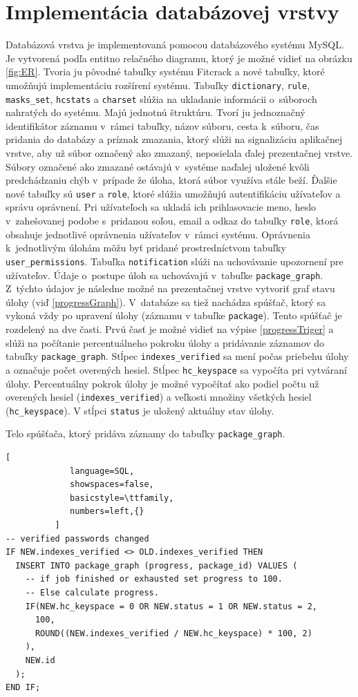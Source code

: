 \documentclass[slovak]{fitthesis}
\begin{document}
\section{Implementácia databázovej vrstvy}
Databázová vrstva je implementovaná pomocou databázového systému MySQL. Je vytvorená podľa entitno relačného diagramu, ktorý je možné vidieť na obrázku \ref{fig:ER}. Tvoria ju pôvodné tabuľky systému Fitcrack a nové tabuľky, ktoré umožňujú implementáciu rozšírení systému. Tabuľky \texttt{dictionary}, \texttt{rule}, \texttt{masks\_set}, \texttt{hcstats} a \texttt{charset} slúžia na ukladanie informácii o~súboroch nahratých do systému. Majú jednotnú štruktúru. Tvorí ju jednoznačný identifikátor záznamu v~rámci tabuľky, názov súboru, cesta k~súboru, čas pridania do databázy a príznak zmazania, ktorý slúži na signalizáciu aplikačnej vrstve, aby už súbor označený ako zmazaný, neposielala ďalej prezentačnej vrstve. Súbory označené ako zmazané ostávajú v~systéme naďalej uložené kvôli predchádzaniu chýb v~prípade že úloha, ktorá súbor využíva stále beží. Ďalšie nové tabuľky sú \texttt{user} a \texttt{role}, ktoré slúžia umožňujú autentifikáciu užívateľov a správu oprávnení. Pri užívateľoch sa ukladá ich prihlasovacie meno, heslo v~zahešovanej podobe s~pridanou soľou, email a odkaz do tabuľky \texttt{role}, ktorá obsahuje jednotlivé oprávnenia užívateľov v~rámci systému. Oprávnenia k~jednotlivým úlohám môžu byť pridané prostredníctvom tabuľky \texttt{user\_permissions}. Tabuľka \texttt{notification} slúži na uchovávanie upozornení pre užívateľov. Údaje o~postupe úloh sa uchovávajú v~tabuľke \texttt{package\_graph}. Z~týchto údajov je následne možné na prezentačnej vrstve vytvoriť graf stavu úlohy (viď \ref{progressGraph}). V~databáze sa tiež nachádza spúšťač, ktorý sa vykoná vždy po upravení úlohy (záznamu v tabuľke \texttt{package}). Tento spúšťač je rozdelený na dve časti. Prvú časť je možné vidieť na výpise \ref{progressTriger} a slúži na počítanie percentuálneho pokroku úlohy a pridávanie záznamov do tabuľky \texttt{package\_graph}. Stĺpec \texttt{indexes\_verified} sa mení počas priebehu úlohy a označuje počet overených hesiel. Stĺpec \texttt{hc\_keyspace} sa vypočíta pri vytváraní úlohy. Percentuálny pokrok úlohy je možné vypočítať ako podiel počtu už overených hesiel (\texttt{indexes\_verified}) a veľkosti množiny všetkých hesiel (\texttt{hc\_keyspace}). V stĺpci \texttt{status} je uložený aktuálny stav úlohy.
\begin{algorithm}
  \caption{Telo spúšťača, ktorý pridáva záznamy do tabuľky \texttt{package\_graph}.}
  \label{progressTriger}
  \begin{lstlisting}[
             language=SQL,
             showspaces=false,
             basicstyle=\ttfamily,
             numbers=left,{}
          ]
-- verified passwords changed
IF NEW.indexes_verified <> OLD.indexes_verified THEN
  INSERT INTO package_graph (progress, package_id) VALUES (
    -- if job finished or exhausted set progress to 100. 
    -- Else calculate progress.
    IF(NEW.hc_keyspace = 0 OR NEW.status = 1 OR NEW.status = 2,
      100,
      ROUND((NEW.indexes_verified / NEW.hc_keyspace) * 100, 2)
    ),
    NEW.id  
  );
END IF;
  \end{lstlisting}
\end{algorithm}
\end{document}

